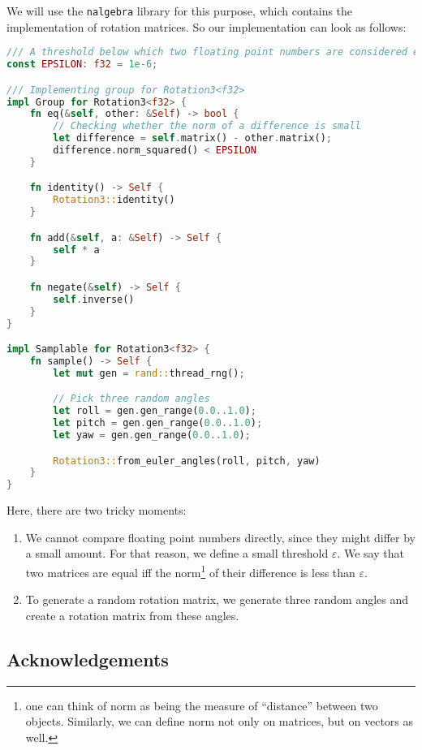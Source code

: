 \documentclass[../lecture-notes-148x210.tex]{subfiles}
\begin{document}
We will use the \texttt{nalgebra} library for this purpose, which contains the implementation of rotation matrices. 
So our implementation can look as follows:
\begin{lstlisting}[language=Rust]
/// A threshold below which two floating point numbers are considered equal.
const EPSILON: f32 = 1e-6;

/// Implementing group for Rotation3<f32>
impl Group for Rotation3<f32> {
    fn eq(&self, other: &Self) -> bool {
        // Checking whether the norm of a difference is small
        let difference = self.matrix() - other.matrix();
        difference.norm_squared() < EPSILON
    }

    fn identity() -> Self {
        Rotation3::identity()
    }

    fn add(&self, a: &Self) -> Self {
        self * a
    }

    fn negate(&self) -> Self {
        self.inverse()
    }
}

impl Samplable for Rotation3<f32> {
    fn sample() -> Self {
        let mut gen = rand::thread_rng();

        // Pick three random angles
        let roll = gen.gen_range(0.0..1.0);
        let pitch = gen.gen_range(0.0..1.0);
        let yaw = gen.gen_range(0.0..1.0);

        Rotation3::from_euler_angles(roll, pitch, yaw)
    }
}
\end{lstlisting}

\vspace{-2mm}

Here, there are two tricky moments:
\begin{enumerate}
    \item We cannot compare floating point numbers directly, since they might differ by a small amount. For that reason, we define a small threshold $\varepsilon$. We say that two matrices are equal iff the norm\footnote{one can think of norm as being the measure of ``distance'' between two objects. Similarly, we can define norm not only on matrices, but on vectors as well.} of their difference is less than $\varepsilon$.
    \item To generate a random rotation matrix, we generate three random angles and create a rotation matrix from these angles.
\end{enumerate}

\subsection*{Acknowledgements}
\end{document}

